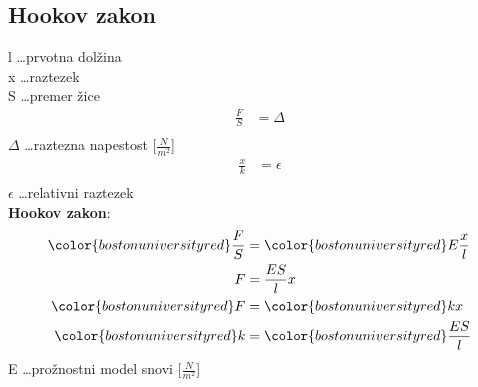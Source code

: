 {\color{indiagreen}\subsection{Hookov zakon}}
l \dots prvotna dolžina\\
x \dots raztezek\\
S \dots premer žice\\
\begin{align*}
	\frac{F}{S} &= \Delta\\
\end{align*}
$\Delta$ \dots raztezna napestost [$\frac{N}{m^2}$]\\
\begin{align*}
	\frac{x}{k} &= \epsilon\\
\end{align*}
$\epsilon$ \dots relativni raztezek\\
\textbf{Hookov zakon}:
\begin{align*}
	{\color{bostonuniversityred}\frac{F}{S}} &= {\color{bostonuniversityred}E\frac{x}{l}}\\
	F &= \frac{ES}{l}x\\
	{\color{bostonuniversityred}F} &= {\color{bostonuniversityred}kx}\\
	{\color{bostonuniversityred}k} &= {\color{bostonuniversityred}\frac{ES}{l}}\\ 
\end{align*}
E \dots prožnostni model snovi [$\frac{N}{m^2}$]

